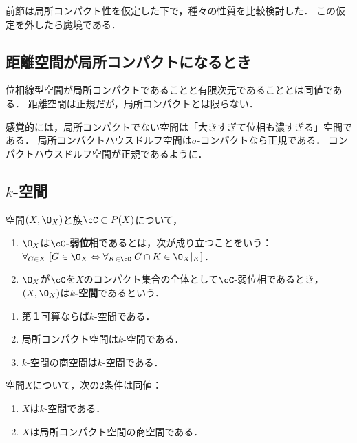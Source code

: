 \documentclass[uplatex,dvipdfmx]{jsreport}
\begin{document}
\begin{tcolorbox}[colframe=ForestGreen, colback=ForestGreen!10!white,breakable,colbacktitle=ForestGreen!40!white,coltitle=black,fonttitle=\bfseries\sffamily,
title=]
    前節は局所コンパクト性を仮定した下で，種々の性質を比較検討した．
    この仮定を外したら魔境である．
\end{tcolorbox}

\subsection{距離空間が局所コンパクトになるとき}

位相線型空間が局所コンパクトであることと有限次元であることとは同値である．
距離空間は正規だが，局所コンパクトとは限らない．

感覚的には，局所コンパクトでない空間は「大きすぎて位相も濃すぎる」空間である．
局所コンパクトハウスドルフ空間は$\sigma$-コンパクトなら正規である．
コンパクトハウスドルフ空間が正規であるように．

\subsection{$k$-空間}

\begin{definition}
    空間$(X,\O_X)$と族$\cC\subset P(X)$について，
    \begin{enumerate}
        \item $\O_X$は\textbf{$\cC$-弱位相}であるとは，次が成り立つことをいう：$\forall_{G\in X}\;[G\in\O_X\Leftrightarrow\forall_{K\in\cC}\;G\cap K\in\O_X|_K]$．
        \item $\O_X$が$\cC$を$X$のコンパクト集合の全体として$\cC$-弱位相であるとき，$(X,\O_X)$は\textbf{$k$-空間}であるという．
    \end{enumerate}
\end{definition}

\begin{proposition}\mbox{}
    \begin{enumerate}
        \item 第１可算ならば$k$-空間である．
        \item 局所コンパクト空間は$k$-空間である．
        \item $k$-空間の商空間は$k$-空間である．
    \end{enumerate}
\end{proposition}

\begin{theorem}
    空間$X$について，次の2条件は同値：
    \begin{enumerate}
        \item $X$は$k$-空間である．
        \item $X$は局所コンパクト空間の商空間である．
    \end{enumerate}
\end{theorem}
\end{document}
